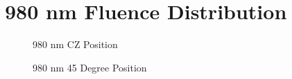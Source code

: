 \documentclass[journal,twoside,web]{ieeecolor}
\begin{document}
\section{980 nm Fluence Distribution}
\label{app:980Simulations}
\begin{figure}[htb!]
    \caption{\label{fig:980-CZ} 980 nm CZ Position}
\end{figure}

\begin{figure}[htb!]
    \caption{\label{fig:980-45} 980 nm 45 Degree Position}
\end{figure}
\end{document}
